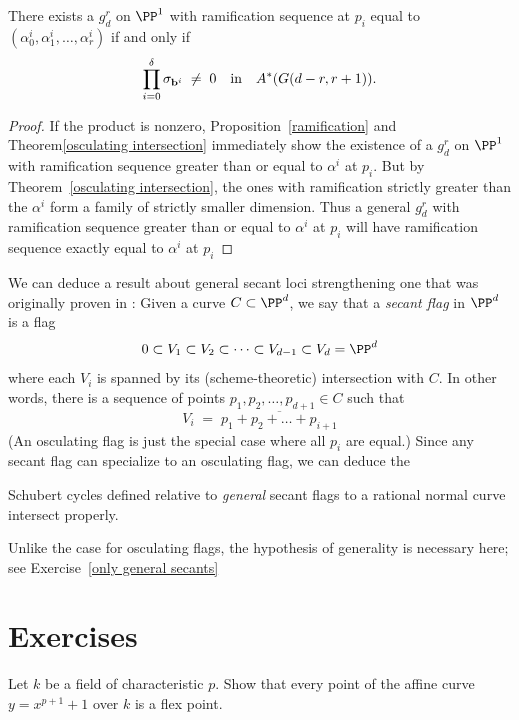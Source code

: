 \begin{corollary}
There exists a $g^r_d$ on $\PP^1$ with ramification sequence at $p_i$ equal to $(\alpha^i_0, \alpha^i_1, \dots, \alpha^i_r)$ if and only if 
$$
\prod_{i=0}^\delta  \sigma_{{\bf b}^i} \; \neq \; 0 \quad \text{in} \quad A^*(G(d-r, r+1)).
$$
\end{corollary}

\begin{proof}
If the product is nonzero, Proposition~\ref{ramification} and Theorem\ref{osculating intersection} immediately show the existence of a $g^r_d$ on $\PP^1$ with ramification sequence greater than or equal to $\alpha^i$ at $p_i$. But by Theorem~\ref{osculating intersection}, the ones with ramification strictly greater than the $\alpha^i$ form a family of strictly smaller dimension. Thus a general $g^r_d$ with ramification sequence greater than or equal to $\alpha^i$ at $p_i$ will have  ramification sequence exactly equal to $\alpha^i$ at $p_i$
\end{proof}

We can deduce a result about general secant loci strengthening one that was originally proven in \cite{Griffiths-Harris-BN}:
Given a curve $C \subset \PP^d$, we say that a \emph{secant flag} in $\PP^d$ is a flag
$$
0 \subset V_1 \subset V_2 \subset \dots \subset V_{d-1} \subset V_d = \PP^d
$$
where each $V_i$ is spanned by its (scheme-theoretic) intersection with $C$. In other words, there is a sequence of points $p_1, p_2, \dots, p_{d+1} \in C$ such that
$$
V_i \; = \; \overline{p_1+p_2+ \dots + p_{i+1}}
$$
(An osculating flag is just the special case where all $p_i$ are equal.) Since any secant flag can specialize to an osculating flag, we can deduce the

\begin{corollary}\label{secant schubert proper}
Schubert cycles defined relative to \emph{general} secant flags to a rational normal curve intersect properly.
\end{corollary} 

Unlike the case for osculating flags, the hypothesis of generality is necessary here; see Exercise~\ref{only general secants}



\section{Exercises}
\begin{exercise}\label{inseparable Gauss}
Let $k$ be a field of characteristic $p$. Show that every point of the affine curve $y = x^{p+1}+1$ over $k$ is a flex point.
 
\end{exercise}


